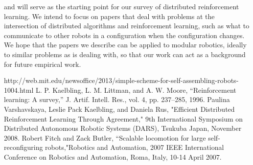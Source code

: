 \documentclass[12pt]{article}
\begin{document}
\cite{distributedreinforcement} and \cite{scalablelocomotion} will serve as the starting point for our survey of distributed reinforcement learning. We intend to focus on papers that deal with problems at the intersection of distributed algorithms and reinforcement learning, such as what to communicate to other robots in a configuration when the configuration changes. We hope that the papers we describe can be applied to modular robotics, ideally to similar problems as \cite{modrobots} is dealing with, so that our work can act as a background for future empirical work. 
\begin{thebibliography}{9}
http://web.mit.edu/newsoffice/2013/simple-scheme-for-self-assembling-robots-1004.html
L. P. Kaelbling, L. M. Littman, and A. W. Moore, “Reinforcement
learning: A survey,” J. Artif. Intell. Res., vol. 4, pp. 237–285, 1996.
Paulina Varshavskaya, Leslie Pack Kaelbling, and Daniela Rus, "Efficient Distributed Reinforcement Learning Through Agreement," 9th International Symposium on Distributed Autonomous Robotic Systems (DARS), Tsukuba Japan, November 2008.
Robert Fitch and  Zack Butler, ``Scalable locomotion for large self-reconfiguring robots,"Robotics and Automation, 2007 IEEE International Conference on Robotics and Automation, Roma, Italy, 10-14 April 2007.

\end{thebibliography}
\end{document}
